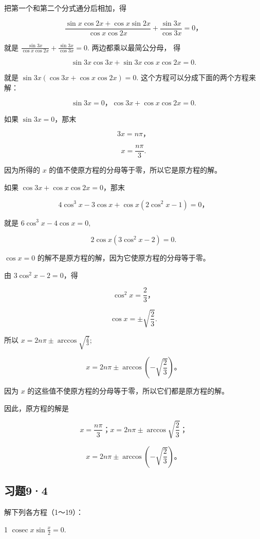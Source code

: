 把第一个和第二个分式通分后相加，得

\[
\frac {\sin x \cos 2 x + \cos x \sin 2 x}{\cos x \cos 2 x} + \frac {\sin 3 x}{\cos 3 x} = 0\text{，}
\]

就是 \(\frac{\sin 3x}{\cos x \cos 2x} + \frac{\sin 3x}{\cos 3x} = 0.\)
两边都乘以最简公分母， 得

\[
\sin 3 x \cos 3 x + \sin 3 x \cos x \cos 2 x = 0.
\]

就是 \(\sin 3x(\cos 3x + \cos x\cos 2x) = 0.\)
这个方程可以分成下面的两个方程来解：

\[
\sin 3 x = 0\text{，} \cos 3 x + \cos x \cos 2 x = 0.
\]

如果 \(\sin 3x = 0\)，那末

\[
3x=n\pi \text{，}
\]

\[
x = \frac {n \pi}{3}.
\]

因为所得的 \(x\) 的值不使原方程的分母等于零，所以它是原方程的解。

如果 \(\cos 3x + \cos x\cos 2x = 0\)，那末

\[
4 \cos^ {3} x - 3 \cos x + \cos x (2 \cos^ {2} x - 1) = 0\text{，}
\]

就是 \(6\cos^3 x - 4\cos x = 0,\)

\[
2 \cos x (3 \cos^ {2} x - 2) = 0.
\]

\(\cos x = 0\) 的解不是原方程的解，因为它使原方程的分母等于零。

由 \(3\cos^2 x - 2 = 0\)，得

\[
\cos^ {2} x = \frac {2}{3}\text{，}
\]

\[
\cos x = \pm \sqrt {\frac {2}{3}}.
\]

所以 \(x = 2n\pi \pm \arccos \sqrt{\frac{2}{3}};\)

\[
x = 2 n \pi \pm \arccos \left(- \sqrt {\frac {2}{3}}\right)\text{。}
\]

因为 \(x\) 的这些值不使原方程的分母等于零，所以它们都是原方程的解。

因此，原方程的解是

\[
x = \frac {n \pi}{3}\text{；} x = 2 n \pi \pm \arccos \sqrt {\frac {2}{3}}\text{；}
\]

\[
x = 2 n \pi \pm \arccos \left(- \sqrt {\frac {2}{3}}\right)\text{。}
\]

\subsection{习题9·4}

解下列各方程（1～19）：

1 \(\operatorname{cosec} x \sin \frac{x}{2} = 0.\)

